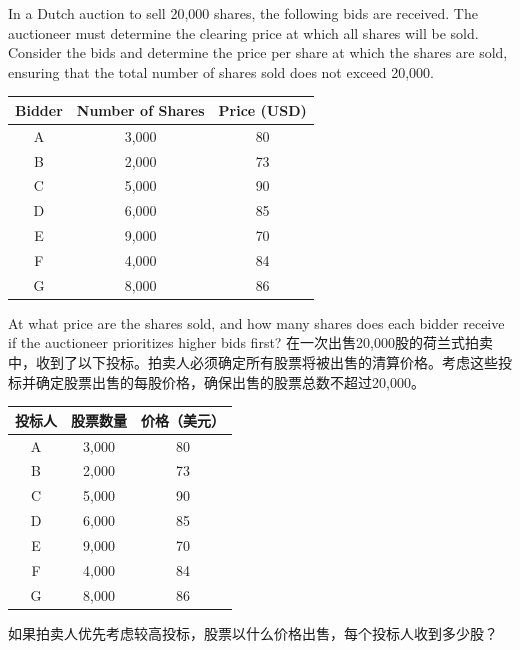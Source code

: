 \documentclass{article}
\newcounter{question} %
\begin{document}
    \begin{question}
        In a Dutch auction to sell 20,000 shares, the following bids are received. The auctioneer must determine the clearing price at which all shares will be sold. Consider the bids and determine the price per share at which the shares are sold, ensuring that the total number of shares sold does not exceed 20,000.
        
        \begin{center}
        \begin{tabular}{|c|c|c|}
        \hline
        \textbf{Bidder} & \textbf{Number of Shares} & \textbf{Price (USD)} \\
        \hline
        A & 3,000 & 80 \\
        B & 2,000 & 73 \\
        C & 5,000 & 90 \\
        D & 6,000 & 85 \\
        E & 9,000 & 70 \\
        F & 4,000 & 84 \\
        G & 8,000 & 86 \\
        \hline
        \end{tabular}
        \end{center}
        
        At what price are the shares sold, and how many shares does each bidder receive if the auctioneer prioritizes higher bids first?
        在一次出售20,000股的荷兰式拍卖中，收到了以下投标。拍卖人必须确定所有股票将被出售的清算价格。考虑这些投标并确定股票出售的每股价格，确保出售的股票总数不超过20,000。
        
        \begin{center}
        \begin{tabular}{|c|c|c|}
        \hline
        \textbf{投标人} & \textbf{股票数量} & \textbf{价格（美元）} \\
        \hline
        A & 3,000 & 80 \\
        B & 2,000 & 73 \\
        C & 5,000 & 90 \\
        D & 6,000 & 85 \\
        E & 9,000 & 70 \\
        F & 4,000 & 84 \\
        G & 8,000 & 86 \\
        \hline
        \end{tabular}
        \end{center}
        
        如果拍卖人优先考虑较高投标，股票以什么价格出售，每个投标人收到多少股？
        \end{question}
        
\end{document}
